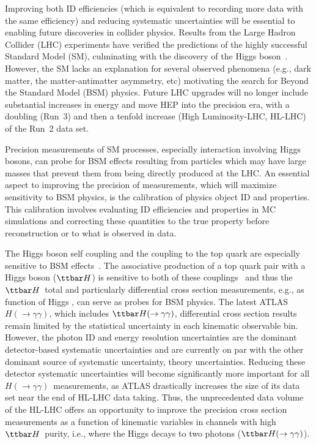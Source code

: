 \documentclass[letter, USenglish, 11pt, subfigure]{article}
\newcommand{\tth}{\ensuremath{\ttbar H}}
\newcommand{\tthyy}{\ensuremath{\ttbar H(\to\gamma\gamma)}}
\newcommand{\hyy}{\ensuremath{H(\to\gamma\gamma)}}
\begin{document}
Improving both ID efficiencies (which is equivalent to recording more data with the same efficiency) and reducing systematic uncertainties will be essential to enabling future discoveries in collider physics.  Results from the Large Hadron Collider (LHC) experiments have verified the predictions of the highly successful Standard Model (SM), culminating with the discovery of the Higgs boson~\cite{HIGG-2012-27,CMS-HIG-12-028}. However, the SM  lacks an explanation for several observed phenomena (e.g., dark matter, the matter-antimatter asymmetry, etc) motivating the search for Beyond the Standard Model (BSM) physics. Future LHC upgrades will no longer include substantial increases in energy and move HEP into the precision era, with a doubling (Run~3) and then a tenfold increase (High Luminosity-LHC, HL-LHC) of the Run~2 data set. 

Precision measurements of SM processes, especially interaction involving Higgs bosons, can probe for BSM effects resulting from particles which may have large masses that prevent them from being directly produced at the LHC. An essential aspect to improving the precision of measurements, which will maximize sensitivity to BSM physics, is the calibration of physics object ID and properties. This calibration involves evaluating ID efficiencies and properties in MC simulations and correcting these quantities to the true property before reconstruction or to what is observed in data. 

The Higgs boson self coupling and the coupling to the top quark are especially sensitive to BSM effects~\cite{Agrawal_2020}. The associative production of a top quark pair with a Higgs boson (\tth) is sensitive to both of these couplings~\cite{Maltoni_2017} and thus the \tth\ total and particularly differential cross section measurements, e.g., as function of Higgs \pt, can serve as probes for BSM physics. The latest ATLAS \hyy, which includes \tthyy, differential cross section results~\cite{ATLAS_STXS} remain limited by the statistical uncertainty in each kinematic observable bin. However, the photon ID and energy resolution uncertainties are the dominant detector-based systematic uncertainties and are currently on par with the other dominant source of systematic uncertainty, theory uncertainties. Reducing these detector systematic uncertainties will become significantly more important for all \hyy\ measurements, as ATLAS drastically increases the size of its data set near the end of HL-LHC data taking. Thus, the unprecedented data volume of the HL-LHC offers an opportunity to improve the precision cross section measurements as a function of kinematic variables in channels with high \tth\ purity, i.e., where the Higgs decays to two photons (\tthyy).
\end{document}
